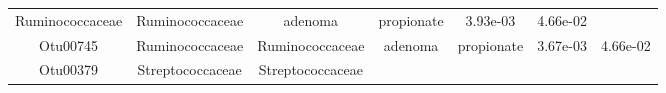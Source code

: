\documentclass[11pt,]{article}
\begin{document}
\begin{longtable}[]{@{}ccccccc@{}}
\begin{minipage}[t]{0.17\columnwidth}
Ruminococcaceae\strut
\end{minipage} & \begin{minipage}[t]{0.17\columnwidth}\centering\strut
Ruminococcaceae\strut
\end{minipage} & \begin{minipage}[t]{0.09\columnwidth}\centering\strut
adenoma\strut
\end{minipage} & \begin{minipage}[t]{0.11\columnwidth}\centering\strut
propionate\strut
\end{minipage} & \begin{minipage}[t]{0.09\columnwidth}\centering\strut
3.93e-03\strut
\end{minipage} & \begin{minipage}[t]{0.09\columnwidth}\centering\strut
4.66e-02\strut
\end{minipage}\tabularnewline
\begin{minipage}[t]{0.09\columnwidth}\centering\strut
Otu00745\strut
\end{minipage} & \begin{minipage}[t]{0.17\columnwidth}\centering\strut
Ruminococcaceae\strut
\end{minipage} & \begin{minipage}[t]{0.17\columnwidth}\centering\strut
Ruminococcaceae\strut
\end{minipage} & \begin{minipage}[t]{0.09\columnwidth}\centering\strut
adenoma\strut
\end{minipage} & \begin{minipage}[t]{0.11\columnwidth}\centering\strut
propionate\strut
\end{minipage} & \begin{minipage}[t]{0.09\columnwidth}\centering\strut
3.67e-03\strut
\end{minipage} & \begin{minipage}[t]{0.09\columnwidth}\centering\strut
4.66e-02\strut
\end{minipage}\tabularnewline
\begin{minipage}[t]{0.09\columnwidth}\centering\strut
Otu00379\strut
\end{minipage} & \begin{minipage}[t]{0.17\columnwidth}\centering\strut
Streptococcaceae\strut
\end{minipage} & \begin{minipage}[t]{0.17\columnwidth}\centering\strut
Streptococcaceae\strut
\end{minipage} & \begin{minipage}[t]{0.09\columnwidth}\centering\strut

\end{minipage}
\end{longtable}
\end{document}
